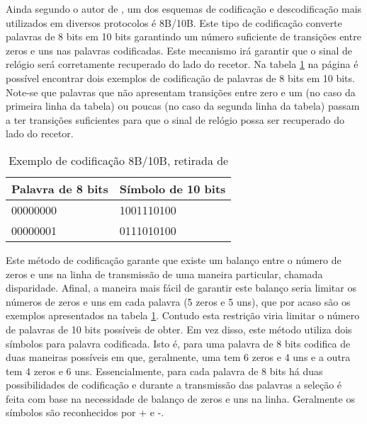 Ainda segundo o autor de \cite{R032}, um dos esquemas de codificação e descodificação mais utilizados em diversos protocolos é 8B/10B. Este tipo de codificação converte palavras de 8 bits em 10 bits garantindo um número suficiente de transições entre zeros e uns nas palavras codificadas. Este mecanismo irá garantir que o sinal de relógio será corretamente recuperado do lado do recetor. Na tabela \ref{table:cod_8b_10b_ex} na página \pageref{table:cod_8b_10b_ex} é possível encontrar dois exemplos de codificação de palavras de 8 bits em 10 bits. Note-se que palavras que não apresentam transições entre zero e um (no caso da primeira linha da tabela) ou poucas (no caso da segunda linha da tabela) passam a ter transições suficientes para que o sinal de relógio possa ser recuperado do lado do recetor.

\begin{table}[h!]
	\centering

	\begin{tabular}{@{}ll@{}}
		\toprule
		\multicolumn{1}{c}{\textbf{Palavra de 8 bits}} & \multicolumn{1}{c}{\textbf{Símbolo de 10 bits}} \\ \midrule
		00000000                                       & 1001110100                                      \\
		00000001                                       & 0111010100                                      \\ \bottomrule
	\end{tabular}
	
	\caption{Exemplo de codificação 8B/10B, retirada de \cite{R032}}
	\label{table:cod_8b_10b_ex}
\end{table}

Este método de codificação garante que existe um balanço entre o número de zeros e uns na linha de transmissão de uma maneira particular, chamada disparidade. Afinal, a maneira mais fácil de garantir este balanço seria limitar os números de zeros e uns em cada palavra (5 zeros e 5 uns), que por acaso são os exemplos apresentados na tabela \ref{table:cod_8b_10b_ex}. Contudo esta restrição viria limitar o número de palavras de 10 bits possíveis de obter. Em vez disso, este método utiliza dois símbolos para palavra codificada. Isto é, para uma palavra de 8 bits codifica de duas maneiras possíveis em que, geralmente, uma tem 6 zeros e 4 uns e a outra tem 4 zeros e 6 uns. Essencialmente, para cada palavra de 8 bits há duas possibilidades de codificação e durante a transmissão das palavras a seleção é feita com base na necessidade de balanço de zeros e uns na linha. Geralmente os símbolos são reconhecidos por + e -.

